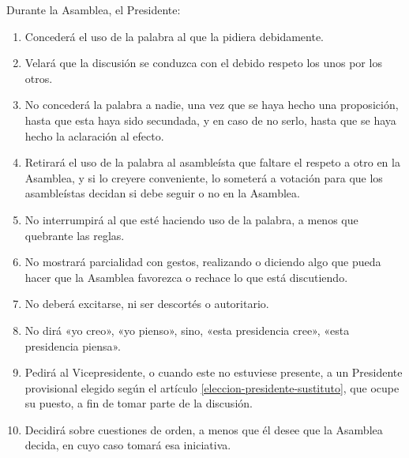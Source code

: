 \article
Durante la Asamblea, el Presidente:
\begin{enumerate}
    \item Concederá el uso de la palabra al que la pidiera debidamente.
    \item Velará que la discusión se conduzca con el debido respeto los unos por los otros.
    \item No concederá la palabra a nadie, una vez que se haya hecho una proposición, hasta que esta haya sido secundada, y en caso de no serlo, hasta que se haya hecho la aclaración al efecto.
    \item Retirará el uso de la palabra al asambleísta que faltare el respeto a otro en la Asamblea, y si lo creyere conveniente, lo someterá a votación para que los asambleístas decidan si debe seguir o no en la Asamblea.
    \item No interrumpirá al que esté haciendo uso de la palabra, a menos que quebrante las reglas.
    \item No mostrará parcialidad con gestos, realizando o diciendo algo que pueda hacer que la Asamblea favorezca o rechace lo que está discutiendo.
    \item No deberá excitarse, ni ser descortés o autoritario.
    \item No dirá «yo creo», «yo pienso», sino, «esta presidencia cree», «esta presidencia piensa».
    \item Pedirá al Vicepresidente, o cuando este no estuviese presente, a un Presidente provisional elegido según el artículo \ref{eleccion-presidente-sustituto}, que ocupe su puesto, a fin de tomar parte de la discusión.
    \item Decidirá sobre cuestiones de orden, a menos que él desee que la Asamblea decida, en cuyo caso tomará esa iniciativa.
\end{enumerate}


